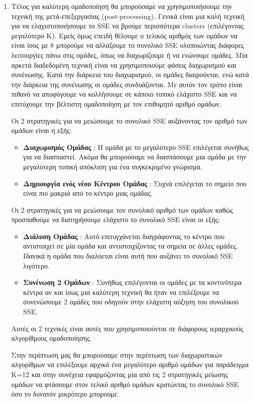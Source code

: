 \begin{enumerate}
    \item Τέλος για καλύτερη ομαδοποίηση θα μπορούσαμε να χρησιμοποιήσουμε την τεχνική της μετά-επεξεργασίας (post-processing). Γενικά είναι μια καλή τεχνική για να ελαχιστοποιήσουμε το SSE να βρούμε περισσότερα clusters (επιλέγοντας μεγαλύτερο Κ). Εμείς όμως επειδή θέλουμε ο τελικός αριθμός των ομάδων να είναι ίσος με 8 μπορούμε να αλλάξουμε το συνολικό SSE υλοποιώντας διάφορες λειτουργίες πάνω στις ομάδες, όπως να διαχωρίζουμε ή να ενώνουμε ομάδες. Μία αρκετά διαδεδομένη τεχνική είναι να χρησιμοποιούμε φάσεις διαχωρισμού και συνένωσης. Κατά την διάρκεια του διαχωρισμού, οι ομάδες διαιρούνται, ενώ κατά την διάρκεια της συνένωσης οι ομάδες συνδυάζονται. Με αυτόν τον τρόπο είναι πιθανό να αποφύγουμε να κολλήσουμε σε κάποιο τοπικό ελάχιστο SSE και να επιτύχουμε την βέλτιστη ομαδοποίηση με τον επιθυμητό αριθμό ομάδων.
    
     Οι 2 στρατηγικές για να μειώσουμε το συνολικό SSE αυξάνοντας τον αριθμό των ομάδων είναι η εξής:
    \begin{itemize}
        \item \textbf{Διαχωρισμός Ομάδας} : Η ομάδα με το μεγαλύτερο SSE επιλέγεται συνήθως για να διασπαστεί. Ακόμα θα μπορούσαμε να διασπάσουμε μια ομάδα με την μεγαλύτερη τυπική απόκλιση για ένα συγκεκριμένο γνώρισμα.
        \item \textbf{Δημιουργία ενός νέου Κέντρου Ομάδας} : Συχνά επιλέγεται το σημείο που είναι πιο μακριά από το κέντρο μιας ομάδας.
    \end{itemize} 
    
    Οι 2 στρατηγικές για να μειώσουμε τον συνολικό αριθμό των ομάδων καθώς προσπαθούμε να διατηρήσουμε ελάχιστο το συνολικό SSE είναι οι εξής:
    
        \begin{itemize}
            \item \textbf{Διάλυση Ομάδας} : Αυτό επιτυγχάνεται διαγράφοντας το κέντρο που αντιστοιχεί σε μία ομάδα και αντιστοιχίζοντας τα σημεία σε άλλες ομάδες. Ιδανικά η ομάδα που διαλύεται είναι αυτή που αυξάνει το συνολικό SSE λιγότερο.
            \item \textbf{Συνένωση 2 Ομάδων} : Συνήθως επιλέγονται οι ομάδες με τα κοντινότερα κέντρα αν και ίσως μια καλύτερη τεχνική θα ήταν να επιλέξουμε να συνενώσουμε 2 ομάδες που οδηγούν στην ελάχιστη αύξηση του συνολικού SSE.
        \end{itemize} 
        
        Αυτές οι 2 τεχνικές είναι αυτές που χρησιμοποιούνται σε διάφορους ιεραρχικούς αλγορίθμους ομαδοποίησης. 
        
        Στην περίπτωση μας θα μπορούσαμε στην περίπτωση των διαχωριστικών αλγορίθμων να επιλέξουμε αρχικά ένα μεγαλύτερο αριθμό ομάδων για παράδειγμα Κ=12 και στην συνέχεια εφαρμόζοντας μία από τις 2 στρατηγικές μείωσης ομάδων να φτάσουμε στον τελικό αριθμό ομάδων κρατώντας το συνολικό SSE όσο το δυνατόν μικρότερο μπορούμε.  
\end{enumerate}
